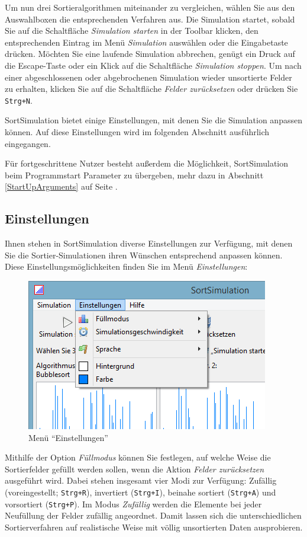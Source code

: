 \documentclass[german]{pfBook}
\begin{document}
	Um nun drei Sortieralgorithmen miteinander zu vergleichen, wählen Sie aus den Auswahlboxen die entsprechenden Verfahren aus. Die Simulation startet, sobald Sie auf die Schaltfläche \emph{Simulation starten} in der Toolbar klicken, den entsprechenden Eintrag im Menü \emph{Simulation} auswählen oder die Eingabetaste drücken. Möchten Sie eine laufende Simulation abbrechen, genügt ein Druck auf die Escape-Taste oder ein Klick auf die Schaltfläche \emph{Simulation stoppen}. Um nach einer abgeschlossenen oder abgebrochenen Simulation wieder unsortierte Felder zu erhalten, klicken Sie auf die Schaltfläche \emph{Felder zurücksetzen} oder drücken Sie \texttt{Strg+N}.
	
	SortSimulation bietet einige Einstellungen, mit denen Sie die Simulation anpassen können. Auf diese Einstellungen wird im folgenden Abschnitt ausführlich eingegangen.
	
	Für fortgeschrittene Nutzer besteht außerdem die Möglichkeit, SortSimulation beim Programmstart Parameter zu übergeben, mehr dazu in Abschnitt \ref{StartUpArguments} auf Seite \pageref{StartUpArguments}.
	
	\subsection{Einstellungen}
	
	Ihnen stehen in SortSimulation diverse Einstellungen zur Verfügung, mit denen Sie die Sortier-Simula\-{}tionen ihren Wünschen entsprechend anpassen können. Diese Ein\-{}stellungs\-{}mög\-{}lich\-{}kei\-{}ten finden Sie im Menü \emph{Einstellungen}:
	
	\begin{figure}[h]
		\centering
		\includegraphics[scale=0.6]{images/image1.png}
		\caption{Menü "`Einstellungen"'}
	\end{figure}
	
	Mithilfe der Option \emph{Füllmodus} können Sie festlegen, auf welche Weise die Sortierfelder gefüllt werden sollen, wenn die Aktion \emph{Felder zurücksetzen} ausgeführt wird. Dabei stehen insgesamt vier Modi zur Verfügung: Zufällig (voreingestellt; \texttt{Strg+R}), invertiert (\texttt{Strg+I}), beinahe sortiert (\texttt{Strg+A}) und vorsortiert (\texttt{Strg+P}). Im Modus \emph{Zufällig} werden die Elemente bei jeder Neufüllung der Felder zufällig angeordnet. Damit lassen sich die unterschiedlichen Sortierverfahren auf realistische Weise mit völlig unsortierten Daten ausprobieren.
	
\end{document}
